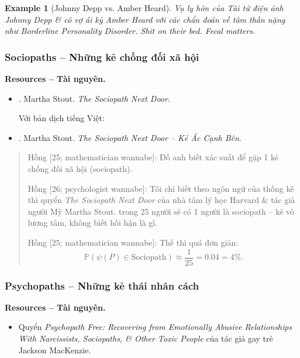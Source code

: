 \documentclass[12pt]{article}
\newtheorem{example}{Example}
\begin{document}
\begin{example}[{\sc Johnny Depp} vs. Amber Heard]
	Vụ ly hôn của Tài tử điện ảnh {\sc Johnny Depp} \& cô vợ ái kỷ Amber Heard với các chẩn đoán về tâm thần nặng như Borderline Personality Disorder. Shit on their bed. Fecal matters.
\end{example}

\subsubsection{Sociopaths -- Những kẻ chống đối xã hội}
\textbf{\textsf{Resources -- Tài nguyên.}}
\begin{itemize}
	\item \cite{Stout_sociopath}. {\sc Martha Stout}. {\it The Sociopath Next Door}.
	
	Với bản dịch tiếng Việt:
	\item \cite{Stout_sociopath_VN}. {\sc Martha Stout}. {\it The Sociopath Next Door -- Kẻ Ác Cạnh Bên}.
\end{itemize}

\begin{quote}
	{\sf Hồng [25; mathematician wannabe]}: Đố anh biết xác suất để gặp 1 kẻ chống đối xã hội (sociopath).
	
	{\sf Hồng [26; psychologist wannabe]}: Tôi chỉ biết theo ngôn ngữ của thống kê thì quyển {\it The Sociopath Next Door} của nhà tâm lý học Harvard \& tác giả người Mỹ {\sc Martha Stout}. trong 25 người sẽ có 1 người là sociopath -- kẻ vô lương tâm, không biết hối hận là gì.
	
	{\sf Hồng [25; mathematician wannabe]}: Thế thì quá đơn giản:
	\begin{equation*}
		\mathbb{P}(\psi(P)\in\mbox{Sociopath})\approx\frac{1}{25} = 0.04 = 4\%.
	\end{equation*}
\end{quote}

\subsubsection{Psychopaths -- Những kẻ thái nhân cách}
\textbf{\textsf{Resources -- Tài nguyên.}}
\begin{itemize}
	\item Quyển {\it Psychopath Free: Recovering from Emotionally Abusive Relationships With Narcissists, Sociopaths, \& Other Toxic People} \cite{MacKenzie2015} của tác giả gay trẻ {\sc Jackson MacKenzie}.
\end{itemize}
\end{document}
